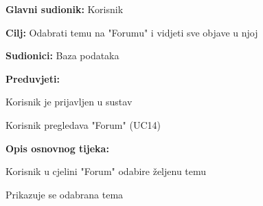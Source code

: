 					\noindent {}
					\begin{packed_item}
	
						\item \textbf{Glavni sudionik: }Korisnik
						\item  \textbf{Cilj:} Odabrati temu na "Forumu" i vidjeti sve objave u njoj
						\item  \textbf{Sudionici:} Baza podataka
						\item  \textbf{Preduvjeti:}
						\item[] \begin{packed_enum}
							\item Korisnik je prijavljen u sustav
							\item Korisnik pregledava "Forum" (UC14)
						\end{packed_enum}
						\item  \textbf{Opis osnovnog tijeka:}
						
						\item[] \begin{packed_enum}
	
							\item Korisnik u cjelini "Forum" odabire željenu temu
							\item Prikazuje se odabrana tema
							
						\end{packed_enum}
						
					\end{packed_item}
					
